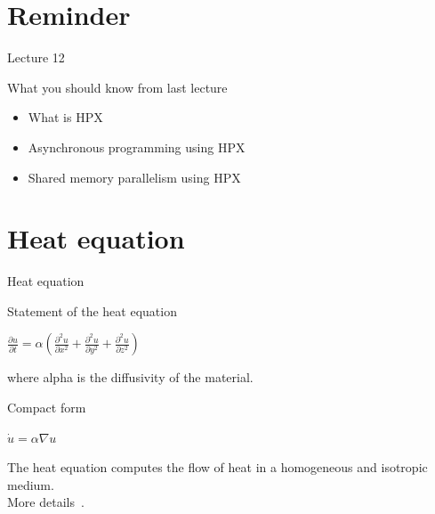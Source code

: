 \documentclass[\classoption]{beamer}
\title{\coursename}
\subtitle{Lecture 12: One-dimensional heat equation}
\author{\tiny Patrick Diehl \orcid{0000-0003-3922-8419}}
\date {
 \tiny \url{\courseurl}
\vspace{2cm}
\doclicenseThis  
  
}
\begin{document}
 {
    \frame {
        \titlepage
    }
}

\frame{

\tableofcontents

}


\section{Reminder}
\begin{frame}{Lecture 12}
\begin{block}{What you should know from last lecture}
\begin{itemize}
\item What is HPX
\item Asynchronous programming using HPX
\item Shared memory parallelism using HPX
\end{itemize}
\end{block}
\end{frame}

\section{Heat equation}

\begin{frame}{Heat equation}

\begin{block}{Statement of the heat equation}
\begin{center}
$\frac{\partial u}{\partial t} = \alpha \left( \frac{\partial^2 u }{\partial x^2} + \frac{\partial^2 u}{\partial y^2} + \frac{\partial^2 u}{\partial z^2} \right)$
\end{center}
where alpha is the diffusivity of the material. 
\end{block}

\begin{block}{Compact form}
\begin{center}
$ \dot u = \alpha \nabla u$
\end{center}
\end{block}
The heat equation computes the flow of heat in a homogeneous and isotropic medium.\\
\vspace{0.25cm}
More details~\cite{cannon1984one}.

\end{frame}
\end{document}
